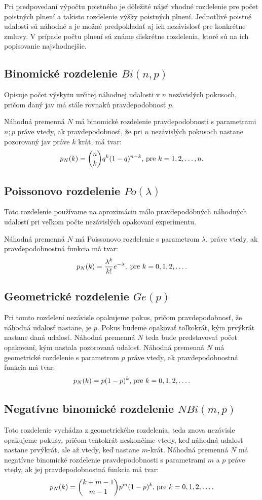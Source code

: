 \documentclass[a4paper,10pt]{article}
\theoremstyle{plain}
\theoremstyle{definition}
\begin{document}
Pri predpovedaní výpočtu poistného je dôležité nájsť vhodné rozdelenie pre počet poistných plnení a takisto rozdelenie výšky poistných plnení. Jednotlivé poistné udalosti sú náhodné a je možné predpokladať aj ich nezávislosť pre konkrétne zmluvy. V prípade počtu plnení sú známe diskrétne rozdelenia, ktoré sú na ich popisovanie najvhodnejšie.
\subsection{Binomické rozdelenie $ Bi(n,p) $}
Opisuje počet výskytu určitej náhodnej udalosti v $ n $ nezávislých pokusoch, pričom daný jav má stále rovnakú pravdepodobnosť $ p $.

Náhodná premenná $ N $ má binomické rozdelenie pravdepodobnosti s parametrami $ n; p $ práve vtedy, ak pravdepodobnosť, že pri $ n $ nezávislých pokusoch nastane pozorovaný jav práve $ k $ krát, má tvar: 
$$ p_{N}(k)=\dbinom{n}{k}\*q^{k}\*(1-q)^{n-k} \text{, pre }k=1,2,\ldots,n\text{.} $$
\subsection{Poissonovo rozdelenie $ Po(\lambda) $}
Toto rozdelenie používame na aproximáciu málo pravdepodobných náhodných udalostí pri veľkom počte nezávislých opakovaní experimentu.

Náhodná premenná $ N $ má Poissonovo rozdelenie s parametrom $ \lambda $, práve vtedy, ak pravdepodobnostná funkcia má tvar:
$$ p_{N}(k)=\frac{\lambda^{k}}{k!}\*e^{-\lambda},\; \text{pre }k =0,1,2,\ldots .$$
\newpage\subsection{Geometrické rozdelenie $ Ge(p) $}
Pri tomto rozdelení nezávisle opakujeme pokus, pričom pravdepodobnosť, že náhodná udalosť nastane, je $ p $. Pokus budeme opakovať toľkokrát, kým prvýkrát nastane daná udalosť. Náhodná premenná $ N $ teda bude predstavovať počet opakovaní, kým nastala pozorovaná udalosť.
Náhodná premenná $ N $ má geometrické rozdelenie s parametrom $ p $ práve vtedy, ak pravdepodobnostná funkcia má tvar:
$$ p_{N}(k)=p\*(1-p)^{k}\text{,}\;\text{pre }k=0,1,2,\ldots .$$
\subsection{Negatívne binomické rozdelenie $ NBi(m,p) $}
Toto rozdelenie vychádza z geometrického rozdelenia, teda znova nezávisle opakujeme
pokusy, pričom tentokrát neskončíme vtedy, keď náhodná udalosť nastane prvýkrát, ale až vtedy, keď nastane $ m $-krát.
Náhodná premenná $ N $ má negatívne binomické rozdelenie pravdepodobnosti s parametrami $ m $ a $ p $ práve vtedy, 
ak jej pravdepodobnostná funkcia má tvar:
$$ p_{N}(k) = \dbinom{k+m-1}{m-1}\*p^{m}\*(1-p)^{k}\text{,}\; \text{pre }k=0,1,2,\ldots \text{.}$$
\newpage
\end{document}

